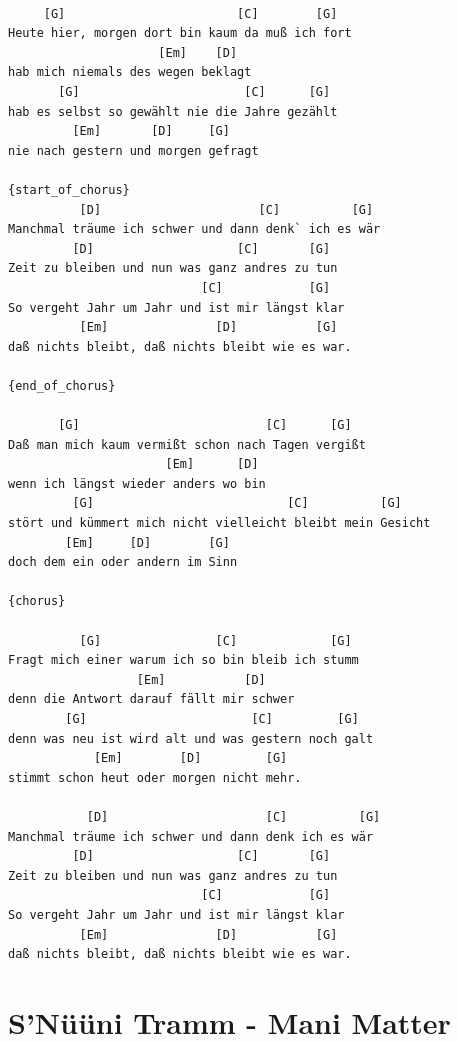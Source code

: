 \documentclass[
]{book}
\let\stdsection\section
\renewcommand\section{\clearpage\stdsection}
\begin{document}
\begin{verbatim}

     [G]                        [C]        [G]
Heute hier, morgen dort bin kaum da muß ich fort
                     [Em]    [D]
hab mich niemals des wegen beklagt
       [G]                       [C]      [G]
hab es selbst so gewählt nie die Jahre gezählt
         [Em]       [D]     [G]
nie nach gestern und morgen gefragt

{start_of_chorus}
          [D]                      [C]          [G]
Manchmal träume ich schwer und dann denk` ich es wär
         [D]                    [C]       [G]
Zeit zu bleiben und nun was ganz andres zu tun
                           [C]            [G]
So vergeht Jahr um Jahr und ist mir längst klar
          [Em]               [D]           [G]
daß nichts bleibt, daß nichts bleibt wie es war.

{end_of_chorus}

       [G]                          [C]      [G]
Daß man mich kaum vermißt schon nach Tagen vergißt
                      [Em]      [D]
wenn ich längst wieder anders wo bin
         [G]                           [C]          [G]
stört und kümmert mich nicht vielleicht bleibt mein Gesicht
        [Em]     [D]        [G]
doch dem ein oder andern im Sinn

{chorus}

          [G]                [C]             [G]
Fragt mich einer warum ich so bin bleib ich stumm
                  [Em]           [D]
denn die Antwort darauf fällt mir schwer
        [G]                       [C]         [G]
denn was neu ist wird alt und was gestern noch galt
            [Em]        [D]         [G]
stimmt schon heut oder morgen nicht mehr.

           [D]                      [C]          [G]
Manchmal träume ich schwer und dann denk ich es wär
         [D]                    [C]       [G]
Zeit zu bleiben und nun was ganz andres zu tun
                           [C]            [G]
So vergeht Jahr um Jahr und ist mir längst klar
          [Em]               [D]           [G]
daß nichts bleibt, daß nichts bleibt wie es war.
\end{verbatim}

\hypertarget{snuxfcuxfcni-tramm---mani-matter}{%
\section{S'Nüüni Tramm - Mani Matter}\label{snuxfcuxfcni-tramm---mani-matter}}
\end{document}
